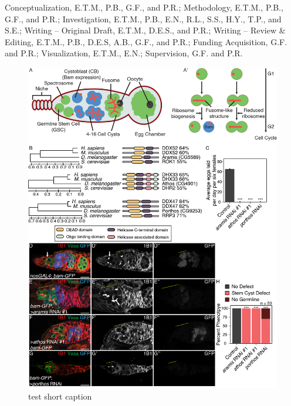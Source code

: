 \documentclass[12pt,oneside]{reedthesis}
\begin{document}
Conceptualization, E.T.M., P.B., G.F., and P.R.; Methodology, E.T.M.,
P.B., G.F., and P.R.; Investigation, E.T.M., P.B., E.N., R.L., S.S.,
H.Y., T.P., and S.E.; Writing -- Original Draft, E.T.M., D.E.S., and
P.R.; Writing -- Review \& Editing, E.T.M., P.B., D.E.S, A.B., G.F., and
P.R.; Funding Acquisition, G.F. and P.R.; Visualization, E.T.M., E.N.;
Supervision, G.F. and P.R.
\begin{figure}

{\centering \includegraphics[width=6.5 in,height=8.9375 in]{./figure/Ribosome Biogenesis/Ribosome Biogenesis 1} 

}

\caption[test short caption]{test short caption}\label{fig:unnamed-chunk-6}
\end{figure}
\end{document}
